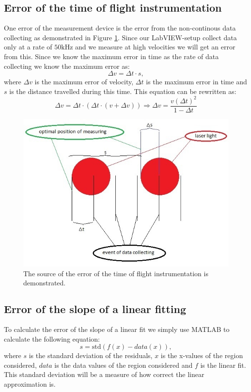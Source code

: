 \documentclass[11pt, a4paper]{article}
\begin{document}
\subsection{Error of the time of flight instrumentation}
One error of the measurement device is the error from the non-continous data collecting as demonstrated in Figure \ref{f:lasercloseup}.
Since our LabVIEW-setup collect data only at a rate of $50\text{kHz}$ and we measure at high velocities we will get an error from this.
Since we know the maximum error in time as the rate of data collecting we know the maximum error as:
\[
	\Delta v=\Delta t\cdot s,
\]
where $\Delta v$ is the maximum error of velocity, $\Delta t$ is the maximum error in time and $s$ is the distance travelled during this time.
This equation can be rewritten as:
\[
	\Delta v=\Delta t\cdot (\Delta t \cdot (v + \Delta v)) \Rightarrow\Delta v = \frac{v(\Delta t)^2}{1-\Delta t}
\]

\begin{figure}[h]
	\centering
	\includegraphics{errorofdevice}
	\caption{The source of the error of the time of flight instrumentation is demonstrated.}
	\label{f:lasercloseup}
\end{figure}



\subsection{Error of the slope of a linear fitting}
To calculate the error of the slope of a linear fit we simply use MATLAB to calculate the following equation:
\begin{equation}
	s = \text{std}(f(x)-data(x)),
	\label{e:std}
\end{equation}
where $s$ is the standard deviation of the residuals, $x$ is the x-values of the region considered, $data$ is the data values of the region considered and $f$ is the linear fit.
This standard deviation will be a measure of how correct the linear approximation is.
\end{document}
